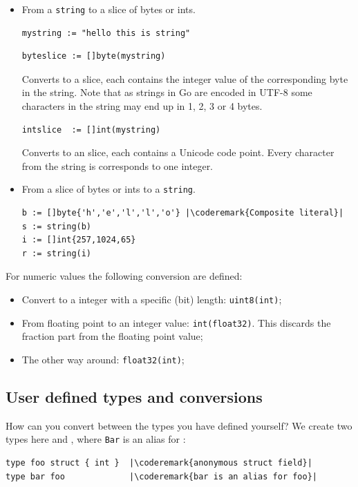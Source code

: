 \begin{itemize}
\item{
From a \lstinline{string} to a slice of bytes or ints.
\begin{lstlisting}
mystring := "hello this is string"
\end{lstlisting}

\begin{lstlisting}
byteslice := []byte(mystring)
\end{lstlisting}
Converts to a  slice, each  contains the integer value
of the corresponding byte in the string. Note that as strings in Go
are encoded in UTF-8 some characters in the string may end up in 1, 2, 3
or 4 bytes.
\begin{lstlisting}
intslice  := []int(mystring)
\end{lstlisting}
Converts to an  slice, each  contains a Unicode code
point. Every character from the string is corresponds to one integer.
}
\item{
From a slice of bytes or ints to a \lstinline{string}.
\begin{lstlisting}
b := []byte{'h','e','l','l','o'} |\coderemark{Composite literal}|
s := string(b)
i := []int{257,1024,65} 
r := string(i)
\end{lstlisting}
}
\end{itemize}
For numeric values the following conversion are defined:
\begin{itemize}
\item{Convert to a integer with a specific (bit) length: 
\lstinline{uint8(int)};}
\item{From floating point to an integer value: 
\lstinline{int(float32)}. This discards the fraction part
from the floating point value;}
\item{The other way around: \lstinline{float32(int)};}
\end{itemize}

\subsection{User defined types and conversions}
How can you convert between the types you have defined
yourself?
We create two types here  and , where
\lstinline{Bar} is an alias for :
\begin{lstlisting}
type foo struct { int }  |\coderemark{anonymous struct field}|
type bar foo             |\coderemark{bar is an alias for foo}|
\end{lstlisting}

